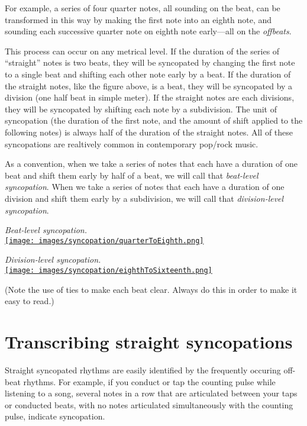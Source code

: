 \documentclass{book}
\begin{document}
For example, a series of four quarter notes, all sounding on the beat, can be
transformed in this way by making the first note into an eighth note, and
sounding each successive quarter note on eighth note early---all on the
\emph{offbeats}.

This process can occur on any metrical level. If the duration of the series of
``straight'' notes is two beats, they will be syncopated by changing the first
note to a single beat and shifting each other note early by a beat. If the
duration of the straight notes, like the figure above, is a beat, they will be
syncopated by a division (one half beat in simple meter). If the straight
notes are each divisions, they will be syncopated by shifting each note by a
subdivision. The unit of syncopation (the duration of the first note, and the
amount of shift applied to the following notes) is always half of the duration
of the straight notes. All of these syncopations are realtively common in
contemporary pop/rock music.

As a convention, when we take a series of notes that each have a duration of
one beat and shift them early by half of a beat, we will call that
\emph{beat-level syncopation}. When we take a series of notes that each have a
duration of one division and shift them early by a subdivision, we will call
that \emph{division-level syncopation}.

\emph{Beat-level syncopation.}\\
\href{images/syncopation/quarterToEighth.png}{\texttt{[image: images/syncopation/quarterToEighth.png]}}

\emph{Division-level syncopation.}\\
\href{images/syncopation/eighthToSixteenth.png}{\texttt{[image: images/syncopation/eighthToSixteenth.png]}}

(Note the use of ties to make each beat clear. Always do this in order to make
it easy to read.)

\hypertarget{transcribing-straight-syncopations}{%
\section{Transcribing straight
syncopations}\label{transcribing-straight-syncopations}}

Straight syncopated rhythms are easily identified by the frequently occuring
off-beat rhythms. For example, if you conduct or tap the counting pulse while
listening to a song, several notes in a row that are articulated between your
taps or conducted beats, with no notes articulated simultaneously with the
counting pulse, indicate syncopation.
\end{document}
